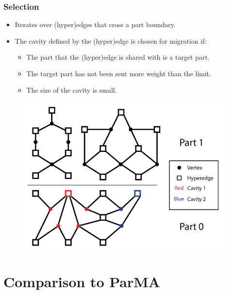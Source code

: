 \documentclass{beamer}
\begin{document}
\begin{frame}
  \frametitle{Selection}
  \begin{minipage}{.5\textwidth}
    \begin{itemize}
    \item Iterates over (hyper)edges that cross a part boundary.
      
    \item The cavity defined by the (hyper)edge is chosen for migration if:
      \begin{itemize}
      \item The part that the (hyper)edge is shared with is a target part.
      \item The target part has not been sent more weight than the limit.
      \item The size of the cavity is small.
      \end{itemize}
    \end{itemize}
  \end{minipage}
  \begin{minipage}{.45\textwidth}

    \begin{figure}
      \centering
      \includegraphics[width=\textwidth]{figures/PartBoundary.png}
    \end{figure}
  \end{minipage}
\end{frame}


\section{Comparison to ParMA}
\end{document}
